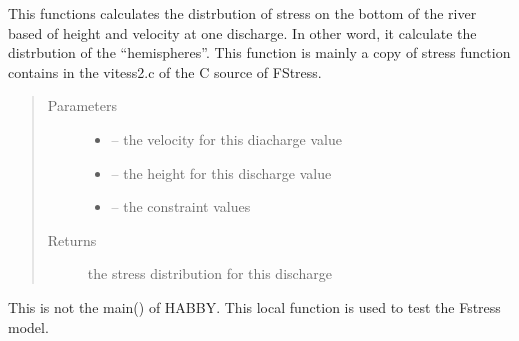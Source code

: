 \documentclass[letterpaper,10pt,english]{sphinxmanual}
\begin{document}
\begin{fulllineitems}
\label{\detokenize{index:src.fstress.func_stress}}
This functions calculates the distrbution of stress on the bottom of the river based of height and velocity
at one discharge. In other word, it calculate the distrbution of the ``hemispheres''.
This function is mainly a copy of stress function contains in the vitess2.c of the C source of FStress.
\begin{quote}\begin{description}
\item[{Parameters}] \leavevmode\begin{itemize}
\item {} 
 -- the velocity for this diacharge value

\item {} 
 -- the height for this discharge value

\item {} 
 -- the constraint values

\end{itemize}

\item[{Returns}] \leavevmode
the stress distribution for this discharge

\end{description}\end{quote}

\end{fulllineitems}


\begin{fulllineitems}
\label{\detokenize{index:src.fstress.main}}
This is not the main() of HABBY. This local function is used to test the Fstress model.

\end{fulllineitems}

\end{document}
